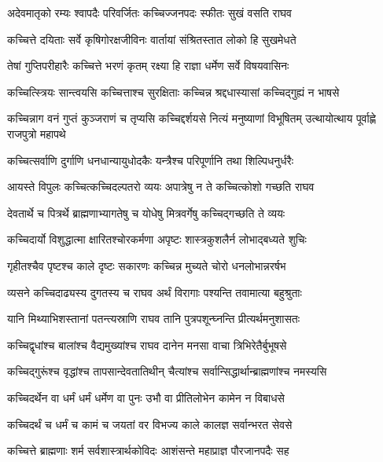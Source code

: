 \twolineshloka
{अदेवमातृको रम्यः श्वापदैः परिवर्जितः}
{कच्चिज्जनपदः स्फीतः सुखं वसति राघव} %

\twolineshloka
{कच्चित्ते दयिताः सर्वे कृषिगोरक्षजीविनः}
{वार्तायां संश्रितस्तात लोको हि सुखमेधते} %

\twolineshloka
{तेषां गुप्तिपरीहारैः कच्चित्ते भरणं कृतम्}
{रक्ष्या हि राज्ञा धर्मेण सर्वे विषयवासिनः} %

\twolineshloka
{कच्चित्स्त्रियः सान्त्वयसि कच्चित्ताश्च सुरक्षिताः}
{कच्चिन्न श्रद्दधास्यासां कच्चिद्गुह्यं न भाषसे} %

\threelineshloka
{कच्चिन्नाग वनं गुप्तं कुञ्जराणं च तृप्यसि}
{कच्चिद्दर्शयसे नित्यं मनुष्याणां विभूषितम्}
{उत्थायोत्थाय पूर्वाह्णे राजपुत्रो महापथे} %

\twolineshloka
{कच्चित्सर्वाणि दुर्गाणि धनधान्यायुधोदकैः}
{यन्त्रैश्च परिपूर्णानि तथा शिल्पिधनुर्धरैः} %

\twolineshloka
{आयस्ते विपुलः कच्चित्कच्चिदल्पतरो व्ययः}
{अपात्रेषु न ते कच्चित्कोशो गच्छति राघव} %

\twolineshloka
{देवतार्थे च पित्रर्थे ब्राह्मणाभ्यागतेषु च}
{योधेषु मित्रवर्गेषु कच्चिद्गच्छति ते व्ययः} %

\twolineshloka
{कच्चिदार्यो विशुद्धात्मा क्षारितश्चोरकर्मणा}
{अपृष्टः शास्त्रकुशलैर्न लोभाद्बध्यते शुचिः} %

\twolineshloka
{गृहीतश्चैव पृष्टश्च काले दृष्टः सकारणः}
{कच्चिन्न मुच्यते चोरो धनलोभान्नरर्षभ} %

\twolineshloka
{व्यसने कच्चिदाढ्यस्य दुगतस्य च राघव}
{अर्थं विरागाः पश्यन्ति तवामात्या बहुश्रुताः} %

\twolineshloka
{यानि मिथ्याभिशस्तानां पतन्त्यस्राणि राघव}
{तानि पुत्रपशून्घ्नन्ति प्रीत्यर्थमनुशासतः} %

\twolineshloka
{कच्चिद्वृधांश्च बालांश्च वैद्यमुख्यांश्च राघव}
{दानेन मनसा वाचा त्रिभिरेतैर्बुभूषसे} %

\twolineshloka
{कच्चिद्गुरूंश्च वृद्धांश्च तापसान्देवतातिथीन्}
{चैत्यांश्च सर्वान्सिद्धार्थान्ब्राह्मणांश्च नमस्यसि} %

\twolineshloka
{कच्चिदर्थेन वा धर्मं धर्मं धर्मेण वा पुनः}
{उभौ वा प्रीतिलोभेन कामेन न विबाधसे} %

\twolineshloka
{कच्चिदर्थं च धर्मं च कामं च जयतां वर}
{विभज्य काले कालज्ञ सर्वान्भरत सेवसे} %

\twolineshloka
{कच्चित्ते ब्राह्मणाः शर्म सर्वशास्त्रार्थकोविदः}
{आशंसन्ते महाप्राज्ञ पौरजानपदैः सह} %

